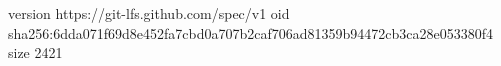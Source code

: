 version https://git-lfs.github.com/spec/v1
oid sha256:6dda071f69d8e452fa7cbd0a707b2caf706ad81359b94472cb3ca28e053380f4
size 2421
